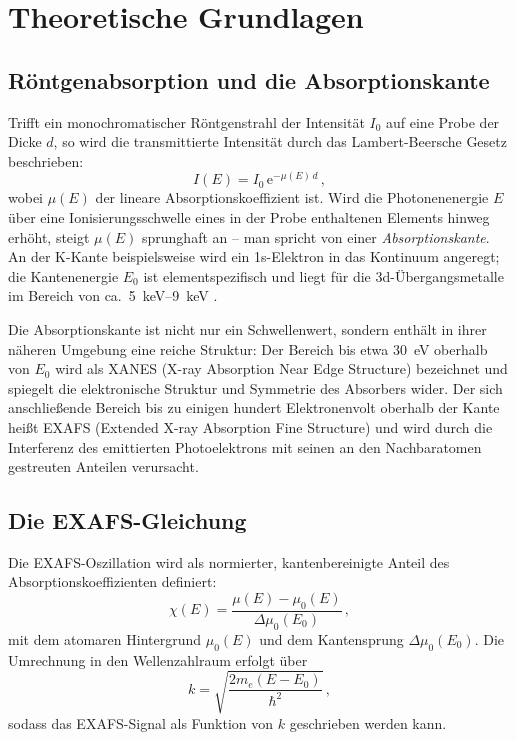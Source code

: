 \chapter{Theoretische Grundlagen}
\label{ch:theorie}

\section{Röntgenabsorption und die Absorptionskante}

Trifft ein monochromatischer Röntgenstrahl der Intensität $I_0$ auf eine
Probe der Dicke $d$, so wird die transmittierte Intensität durch das
Lambert-Beersche Gesetz beschrieben:
\begin{equation}
  I(E) = I_0\,\mathrm{e}^{-\mu(E)\,d}\,,
  \label{eq:lambert}
\end{equation}
wobei $\mu(E)$ der lineare Absorptionskoeffizient ist.
Wird die Photonenenergie $E$ über eine Ionisierungsschwelle eines in der
Probe enthaltenen Elements hinweg erhöht, steigt $\mu(E)$ sprunghaft
an -- man spricht von einer \emph{Absorptionskante}.
An der K-Kante beispielsweise wird ein 1s-Elektron in das Kontinuum
angeregt; die Kantenenergie $E_0$ ist elementspezifisch und liegt für
die 3d-Übergangsmetalle im Bereich von ca.\ \SIrange{5}{9}{\kilo\electronvolt}
\cite{Koningsberger1988}.

Die Absorptionskante ist nicht nur ein Schwellenwert, sondern enthält in
ihrer näheren Umgebung eine reiche Struktur:
Der Bereich bis etwa \SI{30}{\electronvolt} oberhalb von $E_0$ wird
als XANES (X-ray Absorption Near Edge Structure) bezeichnet und
spiegelt die elektronische Struktur und Symmetrie des Absorbers wider.
Der sich anschließende Bereich bis zu einigen hundert Elektronenvolt
oberhalb der Kante heißt EXAFS (Extended X-ray Absorption Fine
Structure) und wird durch die Interferenz des emittierten
Photoelektrons mit seinen an den Nachbaratomen gestreuten Anteilen
verursacht.



\section{Die EXAFS-Gleichung}
\label{sec:exafs-gleichung}

Die EXAFS-Oszillation wird als normierter, kantenbereinigte Anteil des
Absorptionskoeffizienten definiert:
\begin{equation}
  \chi(E) = \frac{\mu(E) - \mu_0(E)}{\Delta\mu_0(E_0)}\,,
  \label{eq:chi_E}
\end{equation}
mit dem atomaren Hintergrund $\mu_0(E)$ und dem Kantensprung
$\Delta\mu_0(E_0)$.
Die Umrechnung in den Wellenzahlraum erfolgt über
\begin{equation}
  k = \sqrt{\frac{2m_e(E - E_0)}{\hbar^2}}\,,
  \label{eq:k_def}
\end{equation}
sodass das EXAFS-Signal als Funktion von $k$ geschrieben werden kann.

